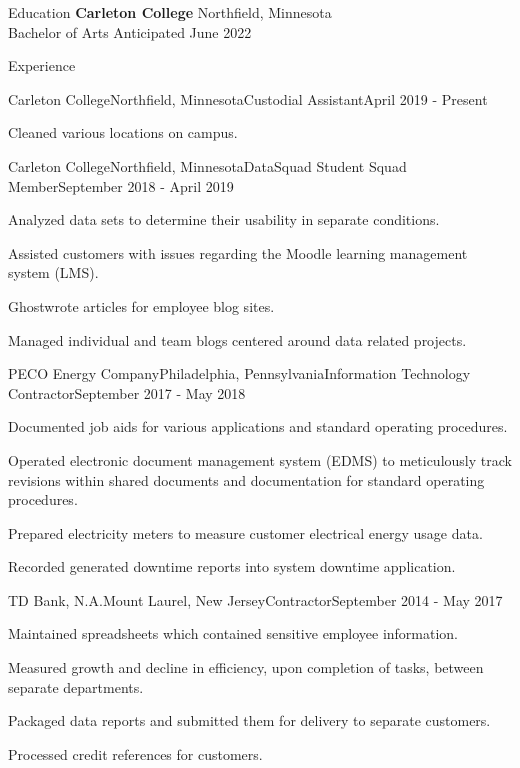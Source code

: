 \documentclass{resume}
\begin{document}
  \begin{rSection}{Education}
    {\bf Carleton College} \hfill {Northfield, Minnesota} \\ 
    {Bachelor of Arts} \hfill {Anticipated June 2022}
  \end{rSection}
  
  \begin{rSection}{Experience}  
  
	\begin{rSubsection}{Carleton College}{Northfield, Minnesota}{Custodial Assistant}{April 2019 - Present}
	\item Cleaned various locations on campus.
	\end{rSubsection}
  
    \begin{rSubsection}{Carleton College}{Northfield, Minnesota}{DataSquad Student Squad Member}{September 2018 - April 2019}
    \item Analyzed data sets to determine their usability in separate conditions.
	\item Assisted customers with issues regarding the Moodle learning management system (LMS).
	\item Ghostwrote articles for employee blog sites.
    \item Managed individual and team blogs centered around data related projects.
    \end{rSubsection}
  
    \begin{rSubsection}{PECO Energy Company}{Philadelphia, Pennsylvania}{Information Technology Contractor}{September 2017 - May 2018}
	\item Documented job aids for various applications and standard operating procedures.
    \item Operated electronic document management system (EDMS) to meticulously track revisions within shared documents and documentation for standard operating procedures.
	\item Prepared electricity meters to measure customer electrical energy usage data.
    \item Recorded generated downtime reports into system downtime application.
    \end{rSubsection}

    \begin{rSubsection}{TD Bank, N.A.}{Mount Laurel, New Jersey}{Contractor}{September 2014 - May 2017}
	\item Maintained spreadsheets which contained sensitive employee information.
	\item Measured growth and decline in efficiency, upon completion of tasks, between separate departments.
	\item Packaged data reports and submitted them for delivery to separate customers.
    \item Processed credit references for customers.
    \end{rSubsection}  
  \end{rSection}
  
\end{document}
